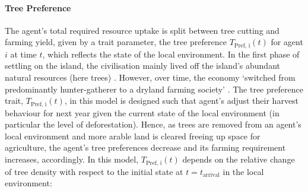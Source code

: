 \paragraph{Tree Preference}
The agent's total required resource uptake is split between tree cutting and farming yield, given by a trait parameter, the tree preference $T_\text{Pref, i}(t)$ for agent $i$ at time $t$, which reflects the state of the local environment.
In the first phase of settling on the island, the civilisation mainly lived off the island's abundant natural resources (here trees) \citet{Bahn2017}.
However, over time, the economy `switched from predominantly hunter-gatherer to a dryland farming society' \citep{Louwagie2006}.
The tree preference trait, $T_\text{Pref, i}(t)$, in this model is designed such that agent's adjust their harvest behaviour for next year given the current state of the local environment (in particular the level of deforestation).
Hence, as trees are removed from an agent's local environment and more arable land is cleared freeing up space for agriculture, the agent's tree preferences decrease and its farming requirement increases, accordingly.
In this model, $T_\text{Pref, i}(t)$ depends on the relative change of tree density with respect to the initial state at $t=t_\text{arrival}$ in the local environment:
